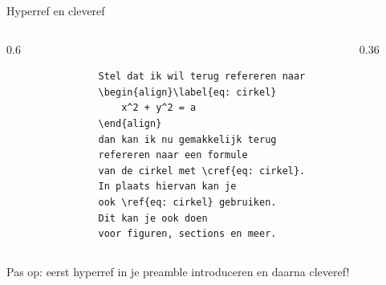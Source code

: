 \begin{frame}[fragile, t]{Hyperref en cleveref}
	\begin{columns}[t]
		\begin{column}{0.6\textwidth}
			\begin{verbatim}
				Stel dat ik wil terug refereren naar 
				\begin{align}\label{eq: cirkel}
					x^2 + y^2 = a
				\end{align}
				dan kan ik nu gemakkelijk terug 
				refereren naar een formule 
				van de cirkel met \cref{eq: cirkel}.
				In plaats hiervan kan je
				ook \ref{eq: cirkel} gebruiken.
				Dit kan je ook doen 
				voor figuren, sections en meer.
			\end{verbatim}
		\end{column}
		
		\begin{column}{0.36\textwidth}
			\vspace{1mm}
		\end{column}
	\end{columns}
	\vspace{0.5cm}
	Pas op: eerst hyperref in je preamble introduceren en daarna cleveref!
\end{frame}